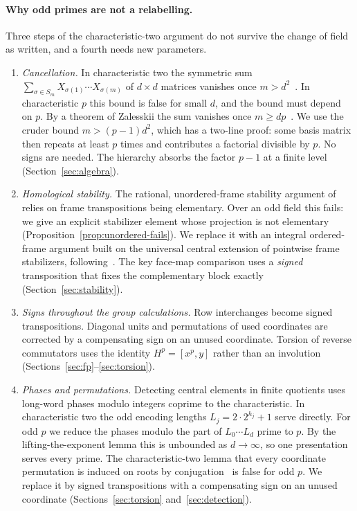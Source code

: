 \documentclass[11pt]{article}
\numberwithin{equation}{section}
\theoremstyle{definition}
\theoremstyle{remark}
\begin{document}
\paragraph{Why odd primes are not a relabelling.} Three steps of the characteristic-two argument do not survive the
change of field as written, and a fourth needs new parameters.
\begin{enumerate}[leftmargin=*]
\item \emph{Cancellation.} In characteristic two the symmetric sum $\sum_{\sigma\in S_m}X_{\sigma(1)}\cdots
  X_{\sigma(m)}$ of $d\times d$ matrices vanishes once $m>d^2$~\cite{OAI247periodic}. In characteristic $p$ this bound is false for small
  $d$, and the bound must depend on $p$. By a theorem of Zalesskii the sum vanishes once $m\geq dp$~\cite{Zalesskii1985}.
  We use the cruder bound $m>(p-1)d^2$, which has a two-line proof: some basis matrix then repeats at least $p$ times
  and contributes a factorial divisible by $p$. No signs are needed. The hierarchy absorbs the factor $p-1$ at a finite level (Section~\ref{sec:algebra}).
\item \emph{Homological stability.} The rational, unordered-frame stability argument of~\cite{OAI247periodic} relies on
  frame transpositions being elementary. Over an odd field this fails: we give an explicit stabilizer element whose
  projection is not elementary (Proposition~\ref{prop:unordered-fails}). We replace it with an integral ordered-frame
  argument built on the universal central extension of pointwise frame stabilizers, following~\cite{OAI247rf}. The key
  face-map comparison uses a \emph{signed} transposition that fixes the complementary block exactly
  (Section~\ref{sec:stability}).
\item \emph{Signs throughout the group calculations.} Row interchanges become signed transpositions. Diagonal units and
  permutations of used coordinates are corrected by a compensating sign on an unused coordinate. Torsion of reverse
  commutators uses the identity $H^p=[x^p,y]$ rather than an involution (Sections~\ref{sec:fp}--\ref{sec:torsion}).
\item \emph{Phases and permutations.} Detecting central elements in finite quotients uses long-word phases modulo
  integers coprime to the characteristic. In characteristic two the odd encoding lengths $L_j=2\cdot2^{h_j}+1$ serve
  directly. For odd $p$ we reduce the phases modulo the part of $L_0\cdots L_d$ prime to $p$. By the lifting-the-exponent
  lemma this is unbounded as $d\to\infty$, so one presentation serves every prime. The characteristic-two lemma that every
  coordinate permutation is induced on roots by conjugation~\cite[Lemma~3.3]{OAI247rf} is false for odd $p$. We replace
  it by signed transpositions with a compensating sign on an unused coordinate (Sections~\ref{sec:torsion}
  and~\ref{sec:detection}).
\end{enumerate}
\end{document}
